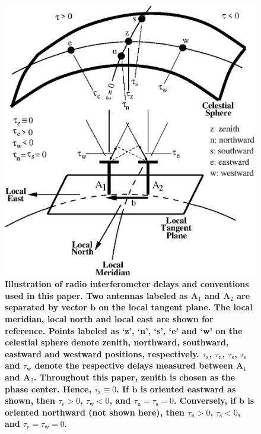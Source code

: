 \documentclass[preprint2,iop,numberedappendix]{emulateapj}
\begin{document}
\begin{figure}[htb]
\centering
\includegraphics[width=\linewidth]{fig1.eps}
\caption{{\bf Illustration of radio interferometer delays and conventions used in this paper. Two antennas labeled as A$_1$ and A$_2$ are separated by vector $\boldsymbol{b}$ on the local tangent plane. The local meridian, local north and local east are shown for reference. Points labeled as `z', `n', `s', `e' and `w' on the celestial sphere denote zenith, northward, southward, eastward and westward positions, respectively. $\tau_\textrm{z}$, $\tau_\textrm{n}$, $\tau_\textrm{s}$, $\tau_\textrm{e}$ and $\tau_\textrm{w}$ denote the respective delays measured between A$_1$ and A$_2$. Throughout this paper, zenith is chosen as the phase center. Hence, $\tau_\textrm{z}\equiv 0$. If $\boldsymbol{b}$ is oriented eastward as shown, then $\tau_\textrm{e} > 0$, $\tau_\textrm{w} < 0$, and $\tau_\textrm{n}=\tau_\textrm{s}=0$. Conversely, if $\boldsymbol{b}$ is oriented northward (not shown here), then $\tau_\textrm{n} > 0$, $\tau_\textrm{s} < 0$, and $\tau_\textrm{e}=\tau_\textrm{w}=0$}. \label{fig:delay-cartoon}}
\end{figure}
\end{document}
